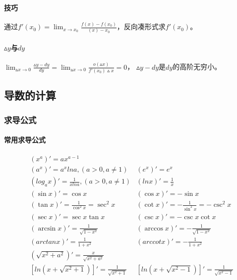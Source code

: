 \documentclass[
12pt, %
a4paper, 
oneside, %
headinclude,footinclude, %
]{scrartcl}
\begin{document}
\paragraph{技巧}
通过$ f'(x_0) = \lim_{x \to x_0}\frac{f(x)-f(x_0)}{(x) - x_0} $，反向凑形式求$ f'(x_0) $。
\paragraph{$ \vartriangle y $与$ dy $}
$ \lim_{\vartriangle x \to 0} \frac{\vartriangle y - dy}{dy} = \lim_{\vartriangle x \to 0} \frac{o(\vartriangle x)}{f'(x_0)\vartriangle x} = 0 $，
$ \vartriangle y - dy $是$ dy $的高阶无穷小。
\subsection{导数的计算}
\subsubsection{求导公式}
\paragraph{常用求导公式}
\begin{align*}
&(x^a)' = ax^{a - 1} \\
&(a^x)' = a^x lna,(a > 0, a \neq 1) &(e^x)' = e^x \\
&(log_a x)' = \frac{1}{x lna},(a > 0, a \neq 1) &(ln x)' = \frac{1}{x}\\
&(\sin x)' = \cos x &(\cos x)' = -\sin x \\
&(\tan x)' = \frac{1}{\cos^2 x} = \sec^2 x &(\cot x)' = -\frac{1}{\sin^2 x} = -\csc^2 x \\
&(\sec x)' = \sec x \tan x &(\csc x)' = -\csc x \cot x \\
&(\arcsin x)' = \frac{1}{\sqrt{1 - x^2}} &(\arccos x)' = -\frac{1}{\sqrt{1 - x^2}} \\
&(arctan x)' = \frac{1}{1 + x^2} &(arccot x)' = -\frac{1}{1 + x^2} \\
&(\sqrt{x^2 + a^2})' = \frac{x}{\sqrt{x^2 + a^2}} \\
&[ln(x + \sqrt{x^2 + 1})]' = \frac{1}{\sqrt{x^2 + 1}} &[ln(x + \sqrt{x^2 - 1})]' = \frac{1}{\sqrt{x^2 - 1}} 
\end{align*}
\end{document}
